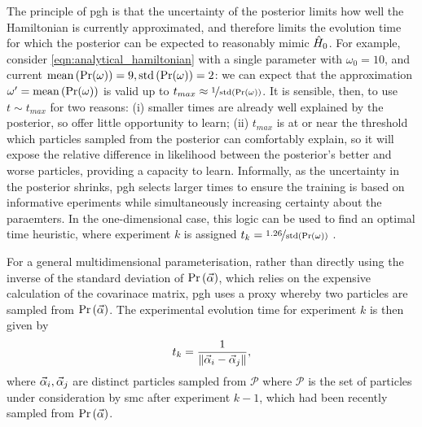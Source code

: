 The principle of \gls{pgh} is that the uncertainty of the posterior limits how well the Hamiltonian is currently 
    approximated, and therefore limits the evolution time for which the posterior can be expected to 
    reasonably mimic $\hat{H}_0$\footnotemark.
For example, consider \cref{eqn:analytical_hamiltonian} with a single parameter with $\omega_0 = 10$,
    and current $\textrm{mean}\left(\Pr(\omega)\right) = 9, \textrm{std}\left(\Pr(\omega)\right) = 2$:
    we can expect that the approximation $\omega^{\prime} = \textrm{mean}\left(\Pr(\omega)\right)$ 
    is valid up to $t_{max} \approx \nicefrac{1}{\textrm{std}\left(\Pr(\omega)\right)}$. 
It is sensible, then, to use $t \sim t_{max}$ for two reasons: 
    (i) smaller times are already well explained by the posterior, so offer little opportunity to learn;
    (ii) $t_{max}$ is at or near the threshold which particles sampled from the posterior can comfortably explain, 
        so it will expose the relative difference in \gls{likelihood} between the posterior's better and worse particles, 
        providing a capacity to learn. 
Informally, as the uncertainty in the posterior shrinks, \gls{pgh} selects larger times 
    to ensure the training is based on informative eperiments while 
    simultaneously increasing certainty about the paraemters. 
In the one-dimensional case, this logic can be used to find an optimal time heuristic, 
    where experiment $k$ is assigned $t_k = \nicefrac{1.26}{\textrm{std}\left(\Pr(\omega)\right)}$ \cite{ferrie2013best}. 
\par
For a general multidimensional parameterisation, 
    rather than directly using the inverse of the standard deviation of $\Pr \left(\vec{\alpha}\right)$, 
    which relies on the expensive calculation of the covarinace matrix, 
    \gls{pgh} uses a proxy whereby two particles are sampled from $\Pr \left(\vec{\alpha}\right)$. 
The experimental evolution time for experiment $k$ is then given by 
\begin{equation}
    \label{eqn:pgh_time}
    t_k = \frac{1}{\| \vec{\alpha}_i - \vec{\alpha}_j \|}, 
\end{equation}
    where $\vec{\alpha}_i, \vec{\alpha}_j$ are distinct particles sampled from $\mathcal{P}$ where 
    $\mathcal{P}$ is the set of particles under consideration by \gls{smc} after experiment $k-1$, 
    which had been recently sampled from $\Pr\left(\vec{\alpha}\right)$. 
\par 


